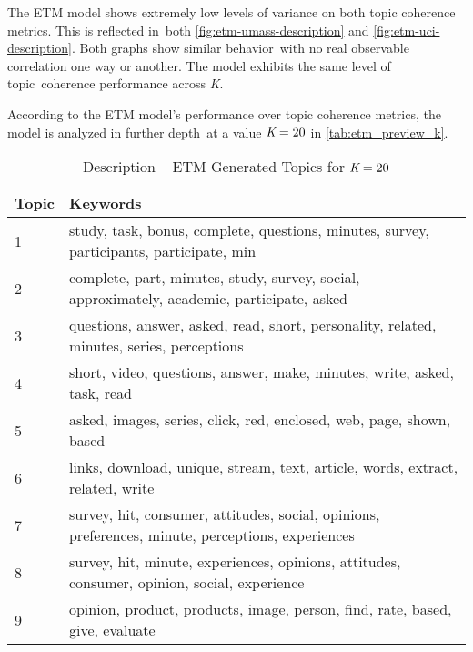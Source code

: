 \documentclass[letterpaper,12pt]{article}
\begin{document}
The ETM model shows extremely low levels of variance on both topic coherence metrics. This is reflected in\
both \ref{fig:etm-umass-description} and \ref{fig:etm-uci-description}. Both graphs show similar behavior\
with no real observable correlation one way or another. The model exhibits the same level of topic\
coherence performance across \emph{K}.


According to the ETM model's performance over topic coherence metrics, the model is analyzed in further depth\
at a value $\emph{K} = 20$ in \ref{tab:etm_preview_k}.
\newpage
\begin{table}
	\caption{\label{tab:etm_description_k} Description -- ETM Generated Topics for $\emph{K} = 20$}
	\begin{center}
		\begin{tabular}{| l | L |}
			\hline
			\textbf{Topic} &                                                                                             \textbf{Keywords} \\
			\hline
			1  &           study, task, bonus, complete, questions, minutes, survey, participants, participate, min \\
			\hline
			2  &        complete, part, minutes, study, survey, social, approximately, academic, participate, asked \\
			\hline
			3  &          questions, answer, asked, read, short, personality, related, minutes, series, perceptions \\
			\hline
			4  &                           short, video, questions, answer, make, minutes, write, asked, task, read \\
			\hline
			5  &                               asked, images, series, click, red, enclosed, web, page, shown, based \\
			\hline
			6  &                     links, download, unique, stream, text, article, words, extract, related, write \\
			\hline
			7  &  survey, hit, consumer, attitudes, social, opinions, preferences, minute, perceptions, experiences \\
			\hline
			8  &       survey, hit, minute, experiences, opinions, attitudes, consumer, opinion, social, experience \\
			\hline
			9  &                       opinion, product, products, image, person, find, rate, based, give, evaluate \\

\end{tabular}
\end{center}
\end{table}
\end{document}
